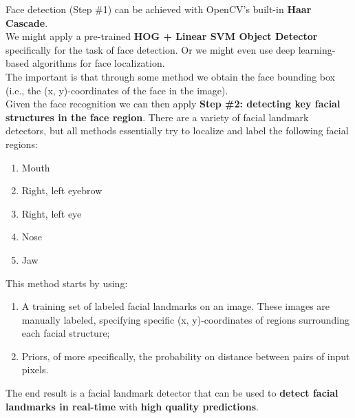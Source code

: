            Face detection (Step \#1) can be achieved with OpenCV's built-in \textbf{Haar Cascade}. \\
            \vspace{3mm}
            We might apply a pre-trained \textbf{HOG + Linear SVM Object Detector} specifically for the task of face detection. Or we might even use deep learning-based algorithms for face localization. \\ 
            \vspace{3mm}
            The important is that through some method we obtain the face bounding box (i.e., the (x, y)-coordinates of the face in the image). \\ 
            \vspace{3mm}
            Given the face recognition we can then apply \textbf{Step \#2: detecting key facial structures in the face region}. There are a variety of facial landmark detectors, but all methods essentially 
            try to localize and label the following facial regions: 
            \begin{enumerate}
                \item Mouth
                \item Right, left eyebrow
                \item Right, left eye 
                \item Nose 
                \item Jaw
            \end{enumerate}
            This method starts by using:
            \begin{enumerate}
                \item A training set of labeled facial landmarks on an image. These images are manually labeled, specifying specific (x, y)-coordinates of regions surrounding each facial structure;
                \item Priors, of more specifically, the probability on distance between pairs of input pixels.
            \end{enumerate}
            The end result is a facial landmark detector that can be used to \textbf{detect facial landmarks in real-time} with \textbf{high quality predictions}.
